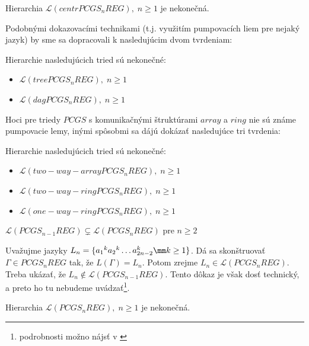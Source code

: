 \begin{dosledok}
Hierarchia $\mathcal{L}(centrPCGS_nREG),\; n\geq 1$ je nekonečná.
\end{dosledok}

Podobnými dokazovacími technikami (t.j. využitím pumpovacích liem
pre nejaký jazyk) by sme sa dopracovali k nasledujúcim dvom
tvrdeniam:

\begin{veta}
Hierarchie nasledujúcich tried sú nekonečné:
\begin{itemize}
\item $\mathcal{L}(treePCGS_nREG),\; n\geq 1$
\item $\mathcal{L}(dagPCGS_nREG),\; n\geq 1$
\end{itemize}
\end{veta}


Hoci pre triedy $PCGS$ s komunikačnými štruktúrami $array$ a
$ring$ nie sú známe pumpovacie lemy, inými spôsobmi sa dájú
dokázať nasledujúce tri tvrdenia:

\begin{veta}
Hierarchie nasledujúcich tried sú nekonečné:
\begin{itemize}
\item $\mathcal{L}(two-way-arrayPCGS_nREG),\; n\geq 1$
\item $\mathcal{L}(two-way-ringPCGS_nREG),\; n\geq 1$
\item $\mathcal{L}(one-way-ringPCGS_nREG),\; n\geq 1$
\end{itemize}
\end{veta}

\begin{veta}
$\mathcal{L}(PCGS_{n-1}REG)\subsetneq\mathcal{L}(PCGS_nREG)$ pre
$n\geq 2$
\end{veta}

\begin{dokaz}
Uvažujme jazyky $L_n=\{{a_1}^k{a_2}^k\dots a^k_{2n-2}\mm k\geq
1\}$. Dá sa skonštruovať \newline $\Gamma\in PCGS_nREG$ tak, že
$L(\Gamma)=L_n$. Potom zrejme $L_n\in\mathcal{L}(PCGS_nREG)$.
Treba ukázať, že $L_n\not\in\mathcal{L}(PCGS_{n-1}REG)$. Tento
dôkaz je však dosť technický, a preto ho tu nebudeme
uvádzať\footnote{podrobnosti možno nájsť v \cite{impact}}.
\end{dokaz}

\begin{dosledok}
Hierarchia $\mathcal{L}(PCGS_nREG),\; n\geq 1$ je nekonečná.
\end{dosledok}

